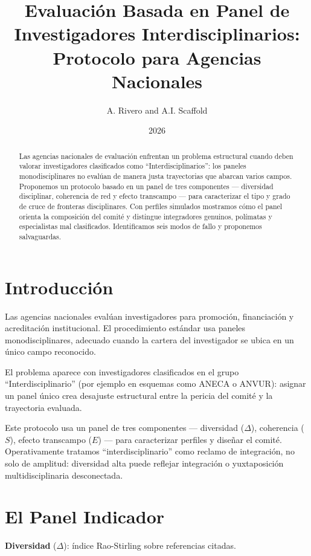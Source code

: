 \documentclass[
]{article}
\title{Evaluación Basada en Panel de Investigadores Interdisciplinarios:
Protocolo para Agencias Nacionales}
\author{A. Rivero and A.I. Scaffold}
\date{2026}
\begin{document}
\maketitle
\begin{abstract}
Las agencias nacionales de evaluación enfrentan un problema estructural
cuando deben valorar investigadores clasificados como
``Interdisciplinarios'': los paneles monodisciplinares no evalúan de
manera justa trayectorias que abarcan varios campos. Proponemos un
protocolo basado en un panel de tres componentes --- diversidad
disciplinar, coherencia de red y efecto transcampo --- para caracterizar
el tipo y grado de cruce de fronteras disciplinares. Con perfiles
simulados mostramos cómo el panel orienta la composición del comité y
distingue integradores genuinos, polímatas y especialistas mal
clasificados. Identificamos seis modos de fallo y proponemos
salvaguardas.
\end{abstract}

\hypertarget{introducciuxf3n}{%
\section{Introducción}\label{introducciuxf3n}}

Las agencias nacionales evalúan investigadores para promoción,
financiación y acreditación institucional. El procedimiento estándar usa
paneles monodisciplinares, adecuado cuando la cartera del investigador
se ubica en un único campo reconocido.

El problema aparece con investigadores clasificados en el grupo
``Interdisciplinario'' (por ejemplo en esquemas como ANECA o ANVUR):
asignar un panel único crea desajuste estructural entre la pericia del
comité y la trayectoria evaluada.

Este protocolo usa un panel de tres componentes --- diversidad
(\(\Delta\)), coherencia (\(S\)), efecto transcampo (\(E\)) --- para
caracterizar perfiles y diseñar el comité. Operativamente tratamos
``interdisciplinario'' como reclamo de integración, no solo de amplitud:
diversidad alta puede reflejar integración o yuxtaposición
multidisciplinaria desconectada.

\hypertarget{el-panel-indicador}{%
\section{El Panel Indicador}\label{el-panel-indicador}}

\textbf{Diversidad} (\(\Delta\)): índice Rao-Stirling sobre referencias
citadas.
\end{document}
